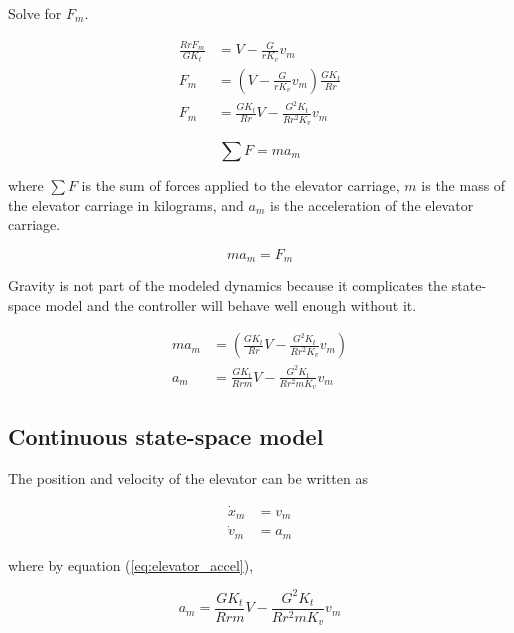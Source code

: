 Solve for $F_m$.

\begin{align}
  \frac{RrF_m}{GK_t} &= V - \frac{G}{rK_v} v_m \nonumber \\
  F_m &= \left(V - \frac{G}{rK_v} v_m\right) \frac{GK_t}{Rr} \nonumber \\
  F_m &= \frac{GK_t}{Rr} V - \frac{G^2K_t}{Rr^2 K_v} v_m \label{eq:elevator_F_m}
\end{align}

\begin{equation}
  \sum F = ma_m \label{eq:elevator_F_ma}
\end{equation}

where $\sum F$ is the sum of forces applied to the elevator carriage, $m$ is the
mass of the elevator carriage in kilograms, and $a_m$ is the acceleration of the
elevator carriage.

\begin{equation*}
  ma_m = F_m
\end{equation*}

\begin{remark}
  Gravity is not part of the modeled dynamics because it complicates the
  state-space \gls{model} and the controller will behave well enough without it.
\end{remark}

\begin{align}
  ma_m &= \left(\frac{GK_t}{Rr} V - \frac{G^2K_t}{Rr^2 K_v} v_m\right)
    \nonumber \\
  a_m &= \frac{GK_t}{Rrm} V - \frac{G^2K_t}{Rr^2 mK_v} v_m
    \label{eq:elevator_accel}
\end{align}

\subsection{Continuous state-space model}

The position and velocity of the elevator can be written as

\begin{align}
  \dot{x}_m &= v_m \label{eq:elevator_cont_ss_pos} \\
  \dot{v}_m &= a_m \label{eq:elevator_cont_ss_vel}
\end{align}

where by equation (\ref{eq:elevator_accel}),

\begin{equation*}
  a_m = \frac{GK_t}{Rrm} V - \frac{G^2 K_t}{Rr^2 m K_v} v_m
\end{equation*}

